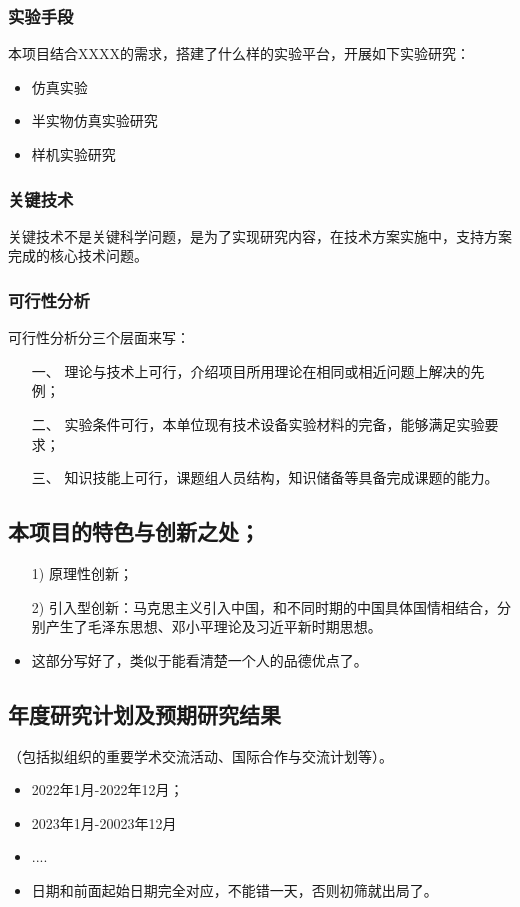 \subsubsection{实验手段}
本项目结合XXXX的需求，搭建了什么样的实验平台，开展如下实验研究：
\begin{itemize}
\item 仿真实验
\item 半实物仿真实验研究
\item 样机实验研究
\end{itemize}


\subsubsection{关键技术}
关键技术不是关键科学问题，是为了实现研究内容，在技术方案实施中，支持方案完成的核心技术问题。


\subsubsection{可行性分析}
可行性分析分三个层面来写：
\begin{itemize}
\item[一、]理论与技术上可行，介绍项目所用理论在相同或相近问题上解决的先例；
\item[二、]实验条件可行，本单位现有技术设备实验材料的完备，能够满足实验要求；
\item[三、]知识技能上可行，课题组人员结构，知识储备等具备完成课题的能力。
\end{itemize}


\subsection{本项目的特色与创新之处；}
\begin{itemize}
\item[1)] 原理性创新；
\item[2)] 引入型创新：马克思主义引入中国，和不同时期的中国具体国情相结合，分别产生了毛泽东思想、邓小平理论及习近平新时期思想。
\item 这部分写好了，类似于能看清楚一个人的品德优点了。
\end{itemize}



\subsection{年度研究计划及预期研究结果}
（包括拟组织的重要学术交流活动、国际合作与交流计划等）。
\begin{itemize}
\item 2022年1月-2022年12月；
\item 2023年1月-20023年12月
\item ....
\item 日期和前面起始日期完全对应，不能错一天，否则初筛就出局了。
\end{itemize}

